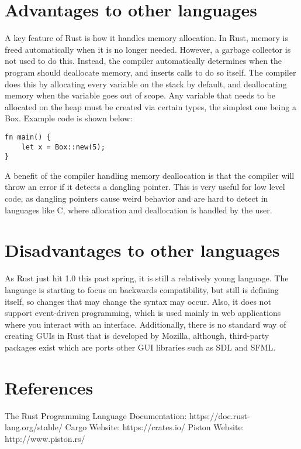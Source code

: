 \documentclass{article}
\begin{document}
\section{Advantages to other languages}
A key feature of Rust is how it handles memory allocation. In Rust, memory is freed automatically when it is no longer needed. However, a garbage collector is not used to do this. Instead, the compiler automatically determines when the program should deallocate memory, and inserts calls to do so itself. The compiler does this by allocating every variable on the stack by default, and deallocating memory when the variable goes out of scope. Any variable that needs to be allocated on the heap must be created via certain types, the simplest one being a Box. Example code is shown below:
\begin{lstlisting}
fn main() {
	let x = Box::new(5);
}
\end{lstlisting}
A benefit of the compiler handling memory deallocation is that the compiler will throw an error if it detects a dangling pointer. This is very useful for low level code, as dangling pointers cause weird behavior and are hard to detect in languages like C, where allocation and deallocation is handled by the user.

\section{Disadvantages to other languages}
As Rust just hit 1.0 this past spring, it is still a relatively young language. The language is starting to focus on backwards compatibility, but still is defining itself, so changes that may change the syntax may occur. Also, it does not support event-driven programming, which is used mainly in web applications where you interact with an interface. Additionally, there is no standard way of creating GUIs in Rust that is developed by Mozilla, although, third-party packages exist which are ports other GUI libraries such as SDL and SFML.

\section{References}
The Rust Programming Language Documentation: https://doc.rust-lang.org/stable/ \newline
Cargo Website: https://crates.io/ \newline
Piston Website: http://www.piston.rs/
\end{document}
